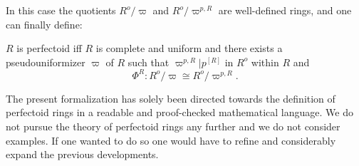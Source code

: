 \documentclass[english,11pt]{article}
\begin{document}
In this case the quotients $R^o/\varpi$ and $R^o/\varpi^{p,R}$ are well-defined
rings, and one can finally define:
\begin{forthel}
\begin{definition}
$R$ is perfectoid iff $R$ is complete and uniform and there
exists a pseudouniformizer $\varpi$ of $R$ such that    
$\varpi^{p,R} | p^{[R]}$ in $R^o$ within $R$
and 
$$\Phi^{R} : R^o / \varpi \cong R^o / \varpi^{p,R}.$$
\end{definition}

\end{forthel}

The present formalization has solely been directed towards 
the definition of perfectoid rings in a readable 
and proof-checked mathematical language. 
We do not pursue the theory of perfectoid rings any further
and we do not consider examples. If one wanted to do so one would 
have to refine and considerably expand the previous developments. 

\printbibliography
\end{document}
